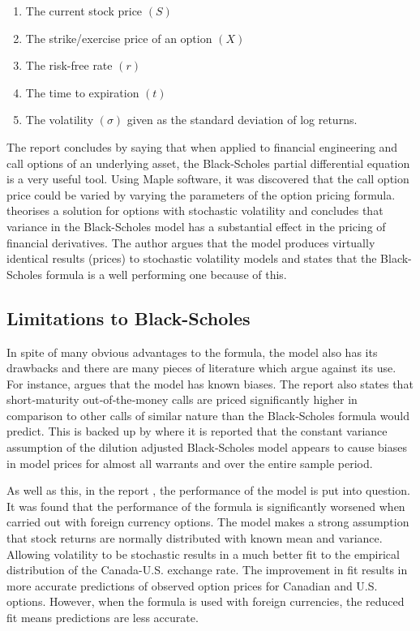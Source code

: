\documentclass[12pt]{article}
\begin{document}
\begin{enumerate}
	\item The current stock price $(S)$
	\item The strike/exercise price of an option $(X)$
	\item The risk-free rate $(r)$
	\item The time to expiration $(t)$
	\item The volatility $(\sigma)$ given as the standard deviation of log returns. 
\end{enumerate}
 
The report \cite{Shinde} concludes by saying that when applied to financial engineering and call options of an underlying asset, the Black-Scholes partial differential equation is a very useful tool. Using Maple software, it was discovered that the call option price could be varied by varying the parameters of the option pricing formula. \cite{Heston} theorises a solution for options with stochastic volatility and concludes that variance in the Black-Scholes model has a substantial effect in the pricing of financial derivatives. The author argues that the model produces virtually identical results (prices) to stochastic volatility models and states that the Black-Scholes formula is a well performing one because of this.

\subsection{Limitations to Black-Scholes} 

In spite of many obvious advantages to the \cite{BSReport} formula, the model also has its drawbacks and there are many pieces of literature which argue against its use. For instance, \cite{Rubinstein} argues that the model has known biases. The report also states that short‐maturity out‐of‐the‐money calls are priced significantly higher in comparison to other calls of similar nature than the Black‐Scholes formula would predict. This is backed up by \cite{Lauterbach} where it is reported that the constant variance assumption of the dilution adjusted Black‐Scholes model appears to cause biases in model prices for almost all warrants and over the entire sample period.

As well as this, in the report \cite{Melino}, the performance of the model is put into question. It was found that the performance of the \cite{BSReport} formula is significantly worsened when carried out with foreign currency options. The model makes a strong assumption that stock returns are normally distributed with known mean and variance. Allowing volatility to be stochastic results in a much better fit to the empirical distribution of the Canada-U.S. exchange rate. The improvement in fit results in more accurate predictions of observed option prices for Canadian and U.S. options. However, when the formula is used with foreign currencies, the reduced fit means predictions are less accurate. 
\end{document}
